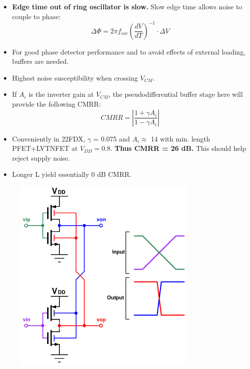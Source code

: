 			\begin{itemize}[itemsep=4pt,label=\protect---]
				\item \textbf{Edge time out of ring oscillator is slow.} Slow edge time allows noise to couple to phase:
				\begin{equation}
					\Delta \Phi = 2\pi f_{osc}\left(\frac{dV}{dT}\right)^{-1}\cdot\Delta V
				\end{equation}
				\item For good phase detector performance and to avoid effects of external loading, buffers are needed.
				\item Highest noise susceptibility when crossing $V_{CM}$.
				\item If $A_i$ is the inverter gain at $V_{CM}$, the pseudodifferential buffer stage here will provide the following CMRR:
				\begin{equation}
				CMRR = \left|\frac{1+\gamma A_i}{1-\gamma A_i}\right|
				\end{equation}
				\item Conveniently in 22FDX, $\gamma$ = 0.075 and $A_i \approx$ 14 with min. length PFET+LVTNFET at $V_{DD}=0.8$. \textbf{Thus CMRR = 26 dB.} This should help reject supply noise.
				\item Longer L yield essentially 0 dB CMRR. 

			\end{itemize}

			\begin{figure}[htb!]
			        \centering
			        \includegraphics[width=0.8\textwidth, angle=0]{./figs/pseudiff_buffer}
			\end{figure}


